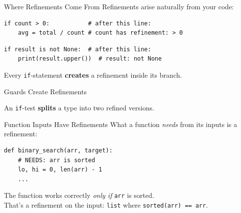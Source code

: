 \documentclass[aspectratio=169,10pt]{beamer}
\begin{document}
\begin{frame}[fragile]{Where Refinements Come From}
Refinements arise naturally from your code:
\begin{lstlisting}
if count > 0:           # after this line:
    avg = total / count # count has refinement: > 0
\end{lstlisting}
\vspace{0.3em}
\begin{lstlisting}
if result is not None:  # after this line:
    print(result.upper())  # result: not None
\end{lstlisting}
\vspace{0.3em}
Every \texttt{if}-statement \textbf{creates} a refinement inside its branch.
\end{frame}

\begin{frame}{Guards Create Refinements}
\begin{center}
\end{center}
An \texttt{if}-test \textbf{splits} a type into two refined versions.
\end{frame}

\begin{frame}[fragile]{Function Inputs Have Refinements}
What a function \emph{needs} from its inputs is a refinement:
\begin{lstlisting}
def binary_search(arr, target):
    # NEEDS: arr is sorted
    lo, hi = 0, len(arr) - 1
    ...
\end{lstlisting}
\vspace{0.3em}
The function works correctly \emph{only if} \texttt{arr} is sorted.\\
That's a refinement on the input: \texttt{list} where \texttt{sorted(arr) == arr}.
\end{frame}
\end{document}
